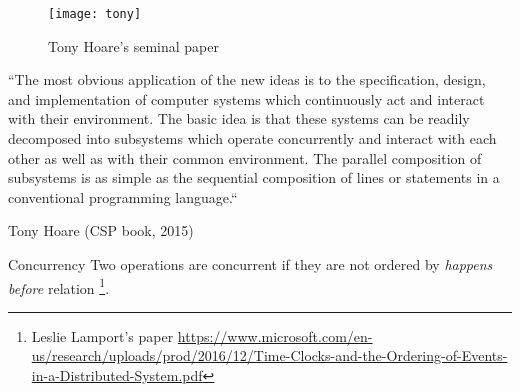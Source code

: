 \documentclass[10pt]{beamer}
\begin{document}
\begin{frame}[fragile]
	\begin{figure}
		\texttt{[image: tony]}
		\caption{Tony Hoare's seminal paper}
	\end{figure}
\end{frame}
\begin{frame}[fragile]
``The most obvious application of the new ideas is to the specification, design,
and implementation of computer systems which continuously act and
interact with their environment. The basic idea is that these systems can be
readily decomposed into subsystems which operate concurrently and interact
with each other as well as with their common environment. The parallel composition
of subsystems is as simple as the sequential composition of lines or
statements in a conventional programming language.``

	Tony Hoare (CSP book, 2015)
\end{frame}



\begin{frame}[fragile]
	\begin{alertblock}{Concurrency}
		Two operations are concurrent if they are not ordered by \emph{happens before} relation%
		\footnote{Leslie Lamport's paper \url{https://www.microsoft.com/en-us/research/uploads/prod/2016/12/Time-Clocks-and-the-Ordering-of-Events-in-a-Distributed-System.pdf}}.
	\end{alertblock}
	

\end{frame}
\end{document}

